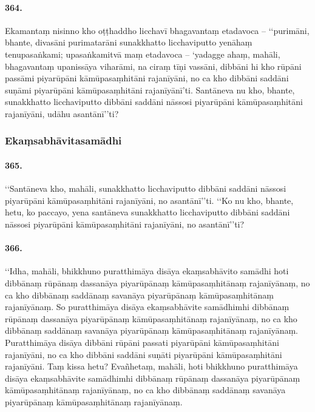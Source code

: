 \paragraph{364.} Ekamantaṃ nisinno kho oṭṭhaddho licchavī bhagavantaṃ etadavoca – ‘‘purimāni, bhante, divasāni purimatarāni sunakkhatto licchaviputto yenāhaṃ tenupasaṅkami; upasaṅkamitvā maṃ etadavoca – ‘yadagge ahaṃ, mahāli, bhagavantaṃ upanissāya viharāmi, na ciraṃ tīṇi vassāni, dibbāni hi kho rūpāni passāmi piyarūpāni kāmūpasaṃhitāni rajanīyāni, no ca kho dibbāni saddāni suṇāmi piyarūpāni kāmūpasaṃhitāni rajanīyānī’ti. Santāneva nu kho, bhante, sunakkhatto licchaviputto dibbāni saddāni nāssosi piyarūpāni kāmūpasaṃhitāni rajanīyāni, udāhu asantānī’’ti?

\subsubsection{Ekaṃsabhāvitasamādhi}

\paragraph{365.} ‘‘Santāneva kho, mahāli, sunakkhatto licchaviputto dibbāni saddāni nāssosi piyarūpāni kāmūpasaṃhitāni rajanīyāni, no asantānī’’ti. ‘‘Ko nu kho, bhante, hetu, ko paccayo, yena santāneva sunakkhatto licchaviputto dibbāni saddāni nāssosi piyarūpāni kāmūpasaṃhitāni rajanīyāni, no asantānī’’ti?

\paragraph{366.} ‘‘Idha, mahāli, bhikkhuno puratthimāya disāya ekaṃsabhāvito samādhi hoti dibbānaṃ rūpānaṃ dassanāya piyarūpānaṃ kāmūpasaṃhitānaṃ rajanīyānaṃ, no ca kho dibbānaṃ saddānaṃ savanāya piyarūpānaṃ kāmūpasaṃhitānaṃ rajanīyānaṃ. So puratthimāya disāya ekaṃsabhāvite samādhimhi dibbānaṃ rūpānaṃ dassanāya piyarūpānaṃ kāmūpasaṃhitānaṃ rajanīyānaṃ, no ca kho dibbānaṃ saddānaṃ savanāya piyarūpānaṃ kāmūpasaṃhitānaṃ rajanīyānaṃ. Puratthimāya disāya dibbāni rūpāni passati piyarūpāni kāmūpasaṃhitāni rajanīyāni, no ca kho dibbāni saddāni suṇāti piyarūpāni kāmūpasaṃhitāni rajanīyāni. Taṃ kissa hetu? Evañhetaṃ, mahāli, hoti bhikkhuno puratthimāya disāya ekaṃsabhāvite samādhimhi dibbānaṃ rūpānaṃ dassanāya piyarūpānaṃ kāmūpasaṃhitānaṃ rajanīyānaṃ, no ca kho dibbānaṃ saddānaṃ savanāya piyarūpānaṃ kāmūpasaṃhitānaṃ rajanīyānaṃ.

